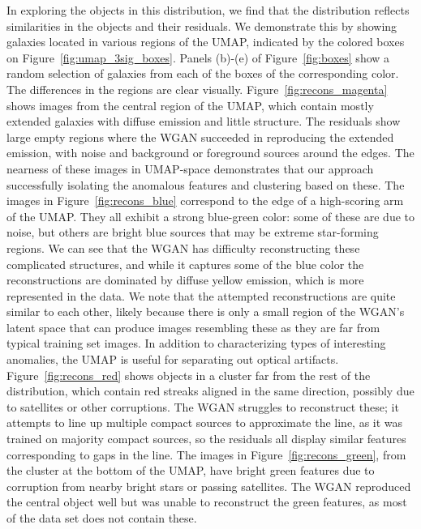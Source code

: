 In exploring the objects in this distribution, we find that the distribution reflects similarities in the objects and their residuals.
We demonstrate this by showing galaxies located in various regions of the UMAP, indicated by the colored boxes on Figure~\ref{fig:umap_3sig_boxes}.
Panels (b)-(e) of Figure~\ref{fig:boxes} show a random selection of galaxies from each of the boxes of the corresponding color.
The differences in the regions are clear visually.
Figure~\ref{fig:recons_magenta} shows images from the central region of the UMAP, which contain mostly extended galaxies with diffuse emission and little structure.
The residuals show large empty regions where the WGAN succeeded in reproducing the extended emission, with noise and background or foreground sources around the edges.
The nearness of these images in UMAP-space demonstrates that our approach successfully isolating the anomalous features and clustering based on these.
The images in Figure~\ref{fig:recons_blue} correspond to the edge of a high-scoring arm of the UMAP.
They all exhibit a strong blue-green color: some of these are due to noise, but others are bright blue sources that may be extreme star-forming regions.
We can see that the WGAN has difficulty reconstructing these complicated structures, and while it captures some of the blue color the reconstructions are dominated by diffuse yellow emission, which is more represented in the data.
We note that the attempted reconstructions are quite similar to each other, likely because there is only a small region of the WGAN's latent space that can produce images resembling these as they are far from typical training set images.
In addition to characterizing types of interesting anomalies, the UMAP is useful for separating out optical artifacts.
Figure~\ref{fig:recons_red} shows objects in a cluster far from the rest of the distribution, which contain red streaks aligned in the same direction, possibly due to satellites or other corruptions.
The WGAN struggles to reconstruct these; it attempts to line up multiple compact sources to approximate the line, as it was trained on majority compact sources, so the residuals all display similar features corresponding to gaps in the line.
The images in Figure~\ref{fig:recons_green}, from the cluster at the bottom of the UMAP, have bright green features due to corruption from nearby bright stars or passing satellites.
The WGAN reproduced the central object well but was unable to reconstruct the green features, as most of the data set does not contain these.


